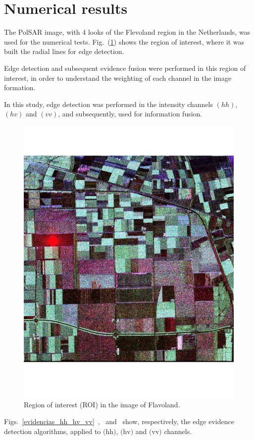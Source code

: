 \documentclass[conference]{IEEEtran}
\begin{document}
\section{Numerical results}\label{sec_08}
The PolSAR image, with 4 looks of the Flevoland region in the Netherlands, was used for the numerical tests. Fig.~(\ref{flevoland_radial_4look}) shows the region of interest, where it was built the radial lines for edge detection.

 Edge detection and subsequent evidence fusion were performed in this region of interest, in order to understand the weighting of each channel in the image formation.

In this study, edge detection was performed in the intensity channels $(hh)$, $(hv)$ and $(vv)$, and subsequently, used for information fusion. 
\begin{figure}[hbt]
\centering
	\includegraphics[scale=0.4]{flevoland_radial_4_look.pdf}
			\vspace{-1.0cm}
	\caption{Region of interest (ROI) in the image of Flavoland.}
\label{flevoland_radial_4look}
\end{figure}
Figs.~\ref{evidencias_hh_hv_vv}~,~ and~ show, respectively, the edge evidence detection algorithms, applied to $\text{(hh)}$, $\text{(hv)}$ and $\text{(vv)}$ channels. 
\end{document}
